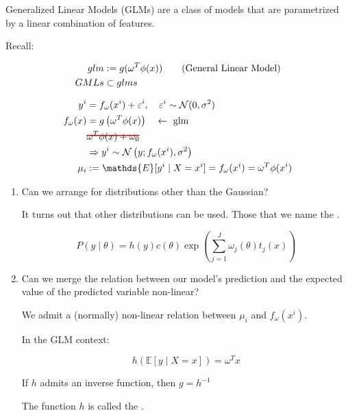 Generalized Linear Models (GLMs) are a class of models that are
parametrized by a linear combination of features.

Recall:

\begin{align*}
	glm  & := g(\omega^T\phi(x))  \tag{\text{General Linear Model}} \\
	GMLs & \subset glms
\end{align*}

\newcommand\hcancel[2][black]{\setbox0=\hbox{$#2$}%
	\rlap{\raisebox{.45\ht0}{\textcolor{#1}{\rule{\wd0}{1pt}}}}#2}


\begin{align*}
	y^i         & = f_\omega(x^i) + \varepsilon^i, \quad \varepsilon^i \sim \mathcal{N}(0, \sigma^2) \\
	f_\omega(x) & = g\left(\omega^T\phi(x)\right) \quad \leftarrow \text{ glm}                       \\
	            & \hcancel[red]{\omega^T\phi(x) + \omega_0}                                          \\
	            & \Rightarrow y^i \sim \mathcal{N}\left(y; f_\omega(x^i), \sigma^2\right)            \\
	\mu_i       & := \mathds{E}[y^i  \mid X = x^i] = f_\omega(x^i) = \omega^T\phi(x^i)
\end{align*}

\begin{enumerate}
	\item Can we arrange for distributions other than the Gaussian?

	      It turns out that other distributions can be used. Those that
	      we name the .

	      \begin{equation*}
		      P(y \mid \theta) = h(y)c(\theta) \exp\left(\sum_{j=1}^J \omega_j(\theta)t_j(x)\right)
	      \end{equation*}

	\item Can we merge the relation between our model's prediction
	      and the expected value of the predicted variable non-linear?

	      We admit a (normally) non-linear relation between $\mu_i$ and $f_\omega(x^i)$.

	      In the GLM context:

	      \begin{equation*}
		      \boxed{
			      h\left(\mathds{E} [y \mid X = x] \right) = \omega^T x
		      }
	      \end{equation*}

	      If $h$ admits an inverse function, then $g = h^{-1}$

	      The function $h$ is called the .

\end{enumerate}

